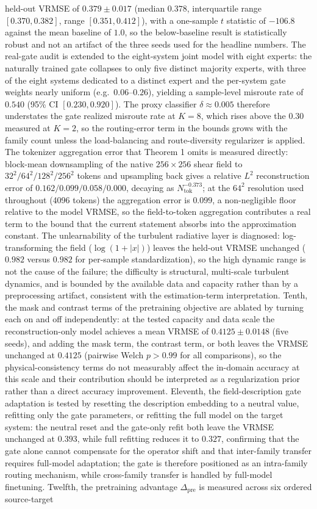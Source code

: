 \documentclass[preprint,12pt]{elsarticle}
\begin{document}
held-out VRMSE of $0.379\pm0.017$ (median $0.378$, interquartile range $[0.370,0.382]$, range $[0.351,0.412]$), with a one-sample $t$ statistic of $-106.8$ against the mean baseline of $1.0$, so the below-baseline result is statistically robust and not an artifact of the three seeds used for the headline numbers. The real-gate audit is extended to the eight-system joint model with eight experts: the naturally trained gate collapses to only five distinct majority experts, with three of the eight systems dedicated to a distinct expert and the per-system gate weights nearly uniform (e.g.\ $0.06$--$0.26$), yielding a sample-level misroute rate of $0.540$ (95\% CI $[0.230,0.920]$). The proxy classifier $\delta\approx0.005$ therefore understates the gate realized misroute rate at $K=8$, which rises above the $0.30$ measured at $K=2$, so the routing-error term in the bounds grows with the family count unless the load-balancing and route-diversity regularizer is applied. The tokenizer aggregation error that Theorem 1 omits is measured directly: block-mean downsampling of the native $256\times256$ shear field to $32^2/64^2/128^2/256^2$ tokens and upsampling back gives a relative $L^2$ reconstruction error of $0.162/0.099/0.058/0.000$, decaying as $N_{\mathrm{tok}}^{-0.373}$; at the $64^2$ resolution used throughout (4096 tokens) the aggregation error is $0.099$, a non-negligible floor relative to the model VRMSE, so the field-to-token aggregation contributes a real term to the bound that the current statement absorbs into the approximation constant. The unlearnability of the turbulent radiative layer is diagnosed: log-transforming the field ($\log(1+|x|)$) leaves the held-out VRMSE unchanged ($0.982$ versus $0.982$ for per-sample standardization), so the high dynamic range is not the cause of the failure; the difficulty is structural, multi-scale turbulent dynamics, and is bounded by the available data and capacity rather than by a preprocessing artifact, consistent with the estimation-term interpretation. Tenth, the mask and contrast terms of the pretraining objective are ablated by turning each on and off independently: at the tested capacity and data scale the reconstruction-only model achieves a mean VRMSE of $0.4125\pm0.0148$ (five seeds), and adding the mask term, the contrast term, or both leaves the VRMSE unchanged at $0.4125$ (pairwise Welch $p>0.99$ for all comparisons), so the physical-consistency terms do not measurably affect the in-domain accuracy at this scale and their contribution should be interpreted as a regularization prior rather than a direct accuracy improvement. Eleventh, the field-description gate adaptation is tested by resetting the description embedding to a neutral value, refitting only the gate parameters, or refitting the full model on the target system: the neutral reset and the gate-only refit both leave the VRMSE unchanged at $0.393$, while full refitting reduces it to $0.327$, confirming that the gate alone cannot compensate for the operator shift and that inter-family transfer requires full-model adaptation; the gate is therefore positioned as an intra-family routing mechanism, while cross-family transfer is handled by full-model finetuning. Twelfth, the pretraining advantage $\Delta_{\mathrm{pre}}$ is measured across six ordered source-target 
\end{document}
